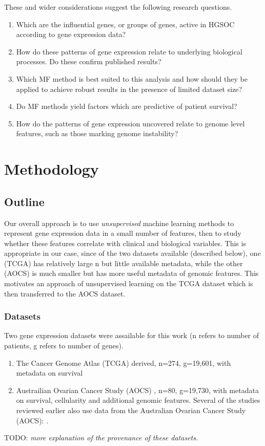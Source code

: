 \documentclass[draft,tikz, 12pt,a4paper,oneside,fleqn]{article}
\begin{document}
These and wider considerations suggest the following research questions.

\begin{enumerate}
\item Which are the influential genes, or groups of genes, active in HGSOC according to gene expression data?   
\item How do these patterns of gene expression relate to underlying biological processes.  Do these confirm published results?
\item Which MF method is best suited to this analysis and how should they be applied to achieve robust results in the presence of limited dataset size?
\item Do MF methods yield factors which are predictive of patient survival?
\item How do the patterns of gene expression uncovered relate to genome level features, such as those marking genome instability?
\end{enumerate}


\section{Methodology}

\subsection{Outline}

Our overall approach is to use \emph{unsupervised} machine learning methods to represent gene expression data in a small number of features, then to study whether these features correlate with clinical and biological variables.  This is appropriate in our case, since of the two datasets available (described below), one (TCGA) has relatively large n but little available metadata, while the other (AOCS) is much smaller but has more useful metadata of genomic features.   This motivates an approach of unsupervised learning on the TCGA dataset which is then transferred to the AOCS dataset.

\subsubsection{Datasets}
Two gene expression datasets were assailable for this work (n refers to number of patients, g refers to number of genes).
\begin{enumerate}
\item The Cancer Genome Atlas (TCGA) derived, n=274, g=19,601, with metadata on survival
\item Austrailian Ovarian Cancer Study (AOCS) \cite{Patch2015}, n=80, g=19,730, with metadata on survival, cellularity and additional genomic features. Several of the studies reviewed earlier also use data from the Australian Ovarian Cancer Study (AOCS): \cite{Patch2015,Ewing2020,Cuello2018,Au-Yeung2014}.
\end{enumerate}
TODO: \emph{more explanation of the provenance of these datasets}.
\end{document}
